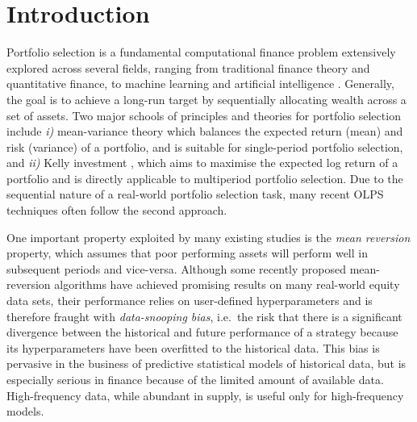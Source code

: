 %


\section{Introduction}
\label{sec:empirical-eval-intro}

Portfolio selection is a fundamental computational finance problem extensively explored across several fields, ranging from traditional finance theory and quantitative finance, to machine learning and artificial intelligence \citep{olps-survey, olps-book}. Generally, the goal is to achieve a long-run target by sequentially allocating wealth across a set of assets. Two major schools of principles and theories for portfolio selection include \emph{i)} mean-variance theory \citep{markowitz52} which balances the expected return (mean) and risk (variance) of a portfolio, and is suitable for single-period portfolio selection, and \emph{ii)} Kelly investment \citep{kelly, breiman, thorp69, thorp71}, which aims to maximise the expected log return of a portfolio and is directly applicable to multiperiod portfolio selection. Due to the sequential nature of a real-world portfolio selection task, many recent OLPS techniques often follow the second approach.

One important property exploited by many existing studies \citep{borodin04, cwmr, pamr, olmar} is the \emph{mean reversion} property, which assumes that poor performing assets will perform well in subsequent periods and vice-versa. Although some recently proposed mean-reversion algorithms \citep{cwmr, pamr, olmar} have achieved promising results on many real-world equity data sets, their performance relies on user-defined hyperparameters and is therefore fraught with \emph{data-snooping bias}, i.e.\ the risk that there is a significant divergence between the historical and future performance of a strategy because its hyperparameters have been overfitted to the historical data. This bias is pervasive in the business of predictive statistical models of historical data, but is especially serious in finance because of the limited amount of available data. High-frequency data, while abundant in supply, is useful only for high-frequency models.

